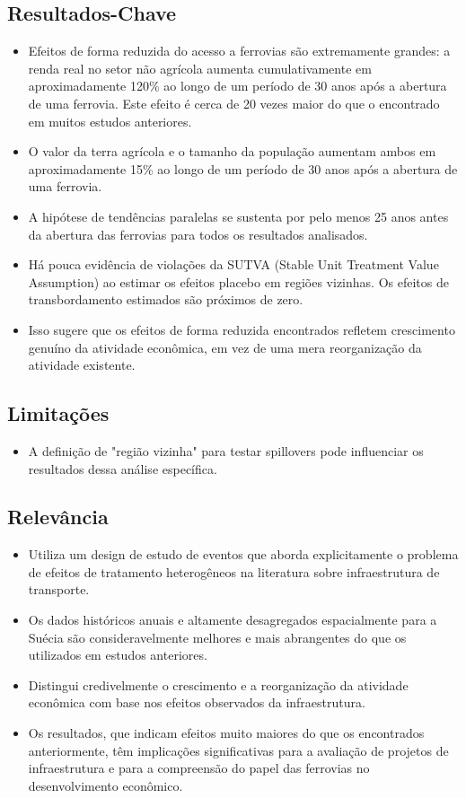 \documentclass[12pt]{article}
\begin{document}
\subsection*{Resultados-Chave}
\begin{itemize}
    \item Efeitos de forma reduzida do acesso a ferrovias são extremamente grandes: a renda real no setor não agrícola aumenta cumulativamente em aproximadamente 120\% ao longo de um período de 30 anos após a abertura de uma ferrovia. Este efeito é cerca de 20 vezes maior do que o encontrado em muitos estudos anteriores.
    \item O valor da terra agrícola e o tamanho da população aumentam ambos em aproximadamente 15\% ao longo de um período de 30 anos após a abertura de uma ferrovia.
    \item A hipótese de tendências paralelas se sustenta por pelo menos 25 anos antes da abertura das ferrovias para todos os resultados analisados.
    \item Há pouca evidência de violações da SUTVA (Stable Unit Treatment Value Assumption) ao estimar os efeitos placebo em regiões vizinhas. Os efeitos de transbordamento estimados são próximos de zero.
    \item Isso sugere que os efeitos de forma reduzida encontrados refletem crescimento genuíno da atividade econômica, em vez de uma mera reorganização da atividade existente.
\end{itemize}

\subsection*{Limitações}
\begin{itemize}
    \item A definição de "região vizinha" para testar spillovers pode influenciar os resultados dessa análise específica.
\end{itemize}

\subsection*{Relevância}
\begin{itemize}
    \item Utiliza um design de estudo de eventos que aborda explicitamente o problema de efeitos de tratamento heterogêneos na literatura sobre infraestrutura de transporte.
    \item Os dados históricos anuais e altamente desagregados espacialmente para a Suécia são consideravelmente melhores e mais abrangentes do que os utilizados em estudos anteriores.
    \item Distingui credivelmente o crescimento e a reorganização da atividade econômica com base nos efeitos observados da infraestrutura.
    \item Os resultados, que indicam efeitos muito maiores do que os encontrados anteriormente, têm implicações significativas para a avaliação de projetos de infraestrutura e para a compreensão do papel das ferrovias no desenvolvimento econômico.
\end{itemize}
\end{document}
